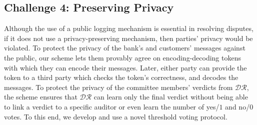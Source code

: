 \vspace{-4mm}
\subsection{Challenge 4: Preserving Privacy}
 Although the use of a public  logging mechanism is essential  in resolving disputes, if it does not use a  privacy-preserving mechanism, then  parties' privacy would be violated. To protect the  privacy of the bank's and customers' messages against the public, our scheme lets them provably agree on encoding-decoding tokens  with which they can  encode their  messages. Later, either party can provide the token to a third party which    checks the token's correctness, and decodes the messages. To protect the privacy of the committee members' verdicts from $\mathcal{DR}$, the scheme   ensures that  $\mathcal{DR}$ can learn only the final verdict without being able to link a verdict to a specific  auditor or even learn the number of yes/$1$ and no/$0$ votes. To this end, we develop and use a novel threshold voting protocol. 
 
 
 
 